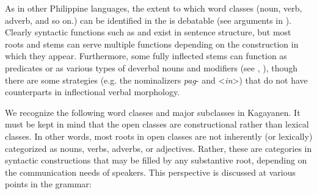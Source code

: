 
As in other Philippine languages, the extent to which word classes (noun, verb, adverb, and so on.) can be identified in the  is debatable (see arguments in \citealt{himmelmann1991, himmelmann2008, foley2008}). Clearly syntactic functions such as  and  exist in sentence structure, but most roots and stems can serve multiple functions depending on the construction in which they appear. Furthermore, some fully inflected stems can function as predicates or as various types of deverbal nouns and modifiers (see , ), though there are some  strategies (e.g. the nominalizers \textit{pag}- and <\textit{in}>) that do not have counterparts in inflectional verbal morphology.

We recognize the following word classes and major subclasses in Kagayanen. It must be kept in mind that the open classes are constructional rather than lexical classes. In other words, most roots in open classes are not inherently (or lexically) categorized as nouns, verbs, adverbs, or adjectives. Rather, these are categories in syntactic constructions that may be filled by any substantive root, depending on the communication needs of speakers. This perspective is discussed at various points in the grammar:


